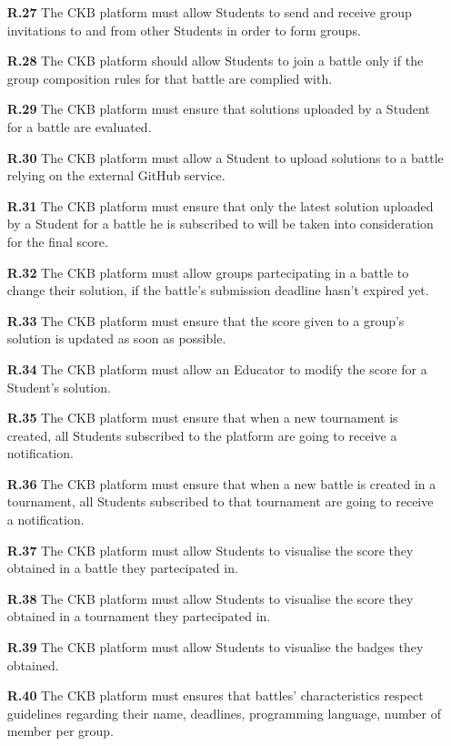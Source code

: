 \documentclass{article}
\begin{document}
{\begin{itemize}
    \item[\textbf{R.27}] The CKB platform must allow Students to send and receive group invitations to and from
          other Students in order to form groups.
    \item[\textbf{R.28}] The CKB platform should allow Students to join a battle only if the group composition rules
          for that battle are complied with.
    \item[\textbf{R.29}] The CKB platform must ensure that solutions uploaded by a Student for a battle are evaluated.
    \item[\textbf{R.30}] The CKB platform must allow a Student to upload solutions to a battle relying on the
          external GitHub service.
    \item[\textbf{R.31}] The CKB platform must ensure that only the latest solution uploaded by a Student for a battle he is subscribed to will
          be taken into consideration for the final score.
    \item[\textbf{R.32}] The CKB platform must allow groups partecipating in a battle to change their solution,
          if the battle's submission deadline hasn't expired yet.
    \item[\textbf{R.33}] The CKB platform must ensure that the score given to a group's solution is
          updated as soon as possible.
    \item[\textbf{R.34}] The CKB platform must allow an Educator to modify the score for a Student's solution.
    \item[\textbf{R.35}] The CKB platform must ensure that when a new tournament is created, all
          Students subscribed to the platform are going to receive a notification.
    \item[\textbf{R.36}] The CKB platform must ensure that when a new battle is created in a tournament,
          all Students subscribed to that tournament are going to receive a notification.
    \item[\textbf{R.37}] The CKB platform must allow Students to visualise the score they obtained in a battle they partecipated in.
    \item[\textbf{R.38}] The CKB platform must allow Students to visualise the score they obtained in a tournament they partecipated in.
    \item[\textbf{R.39}] The CKB platform must allow Students to visualise the badges they obtained.
    \item[\textbf{R.40}] The CKB platform must ensures that battles' characteristics respect guidelines
          regarding their name, deadlines, programming language, number of member per group.
\end{itemize}

}
\end{document}
